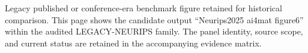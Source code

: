 Legacy published or conference-era benchmark figure retained for historical comparison. This page shows the candidate output ``Neurips2025 ai4mat figure6'' within the audited LEGACY-NEURIPS family. The panel identity, source scope, and current status are retained in the accompanying evidence matrix.
